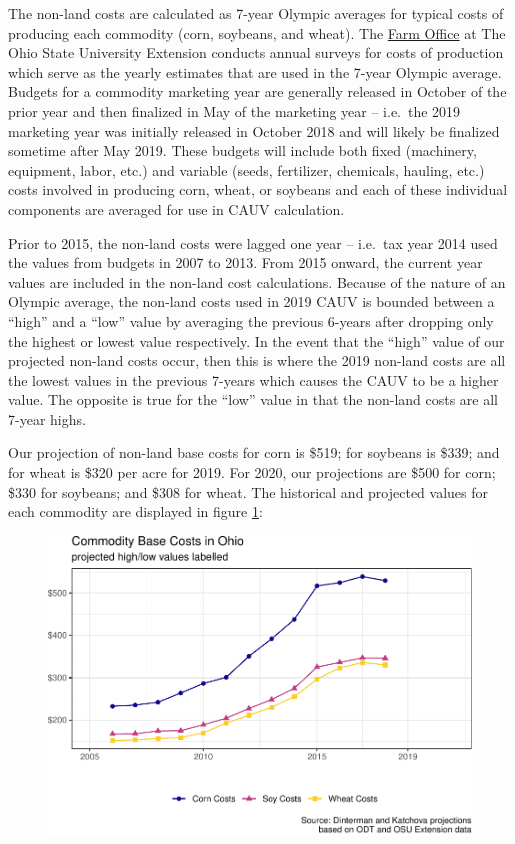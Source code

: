 \documentclass[]{article}
\begin{document}
The non-land costs are calculated as 7-year Olympic averages for typical
costs of producing each commodity (corn, soybeans, and wheat). The
\href{https://farmoffice.osu.edu/farm-management-tools/farm-budgets}{Farm
Office} at The Ohio State University Extension conducts annual surveys
for costs of production which serve as the yearly estimates that are
used in the 7-year Olympic average. Budgets for a commodity marketing
year are generally released in October of the prior year and then
finalized in May of the marketing year -- i.e.~the 2019 marketing year
was initially released in October 2018 and will likely be finalized
sometime after May 2019. These budgets will include both fixed
(machinery, equipment, labor, etc.) and variable (seeds, fertilizer,
chemicals, hauling, etc.) costs involved in producing corn, wheat, or
soybeans and each of these individual components are averaged for use in
CAUV calculation.

Prior to 2015, the non-land costs were lagged one year -- i.e.~tax year
2014 used the values from budgets in 2007 to 2013. From 2015 onward, the
current year values are included in the non-land cost calculations.
Because of the nature of an Olympic average, the non-land costs used in
2019 CAUV is bounded between a ``high'' and a ``low'' value by averaging
the previous 6-years after dropping only the highest or lowest value
respectively. In the event that the ``high'' value of our projected
non-land costs occur, then this is where the 2019 non-land costs are all
the lowest values in the previous 7-years which causes the CAUV to be a
higher value. The opposite is true for the ``low'' value in that the
non-land costs are all 7-year highs.

Our projection of non-land base costs for corn is \$519; for soybeans is
\$339; and for wheat is \$320 per acre for 2019. For 2020, our
projections are \$500 for corn; \$330 for soybeans; and \$308 for wheat.
The historical and projected values for each commodity are displayed in
figure \ref{fig:viz-nonland}:

\begin{figure}[H]
\includegraphics[width=1\linewidth]{4-projections-2019-2020_files/figure-latex/viz-nonland-1} \caption{\label{fig:viz-nonland}}\label{fig:viz-nonland}
\end{figure}
\end{document}
